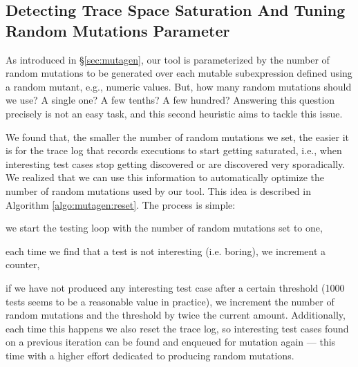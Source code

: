 \documentclass[sigconf, anonymous, review]{acmart}
\begin{document}
\subsection{Detecting Trace Space Saturation And Tuning Random Mutations Parameter}

As introduced in \S \ref{sec:mutagen}, our tool is parameterized by the
number of random mutations to be generated over each mutable subexpression
defined using a random mutant, e.g., numeric values.
%
But, how many random mutations should we use? A single one? A few tenths? A few
hundred?
%
Answering this question precisely is not an easy task, and this second heuristic
aims to tackle this issue.

We found that, the smaller the number of random mutations we set, the easier it
is for the trace log that records executions to start getting saturated, i.e.,
when interesting test cases stop getting discovered or are discovered very
sporadically.
%
We realized that we can use this information to automatically optimize the
number of random mutations used by our tool.
%
This idea is described in Algorithm \ref{algo:mutagen:reset}.
%
The process is simple:
%
\begin{inparaenum}
  \item we start the testing loop with the number of random mutations set to
    one,
  \item each time we find that a test is not interesting (i.e. boring), we
    increment a counter,
  \item if we have not produced any interesting test case after a certain
    threshold (1000 tests seems to be a reasonable value in practice), we
    increment the number of random mutations and the threshold by twice the
    current amount.
    Additionally, each time this happens we also reset the trace log, so
    interesting test cases found on a previous iteration can be found and
    enqueued for mutation again --- this time with a higher effort dedicated to
    producing random mutations.
\end{inparaenum}
\end{document}
